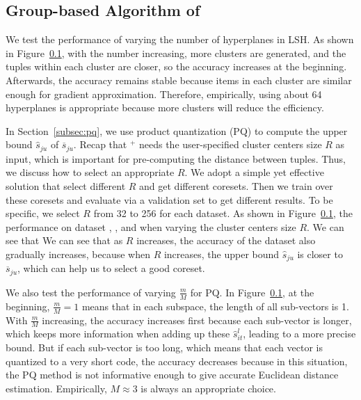 \subsection{Group-based Algorithm of \ours}
 We test the performance of varying the number of hyperplanes in LSH. As shown in Figure~\ref{}, with the number increasing, more clusters are generated, and the tuples within each cluster are closer, so the  accuracy increases at the beginning. Afterwards, the accuracy remains stable because items in each cluster are similar enough for gradient approximation. Therefore, empirically, using about 64 hyperplanes is appropriate because more clusters will reduce the efficiency.

In Section~\ref{subsec:pq}, we use product quantization (PQ) to compute the upper bound $\hat{s}_{ju}$ of $\overline{s}_{ju}$. Recap that \ours$^+$ needs the user-specified cluster centers size $R$ as input, which is important for pre-computing the distance between tuples. Thus, we discuss how to select an appropriate $R$. We adopt a simple yet effective solution that select different $R$ and get different coresets. Then we train over these coresets and evaluate via a validation set to get different results. To be specific, we select $R$ from 32 to 256 for each dataset. As shown in Figure~\ref{}, the performance on dataset \hr, \adult, \bike and \imdbl when varying the cluster centers size $R$. We can see that We can see that as $R$ increases, the accuracy of the dataset also gradually increases, because when $R$ increases, the upper bound $\hat{s}_{ju}$ is closer to $\overline{s}_{ju}$, which can help us to select a good coreset.


We also test the performance of varying $\frac{m}{M}$ for PQ. In Figure~\ref{}, at the beginning,  $\frac{m}{M}=1$ means that in each subspace, the length of all sub-vectors is 1. With $\frac{m}{M}$ increasing, the accuracy increases first because each sub-vector is longer, which keeps more information when adding up these $\hat{s}^l_{it}$, leading to a more precise bound. But if each sub-vector is too long, which means that each vector is quantized to a very short code, the accuracy decreases because in this situation, the PQ method is not informative enough to give accurate Euclidean distance estimation. Empirically, $M\approx3$ is always an appropriate choice.
